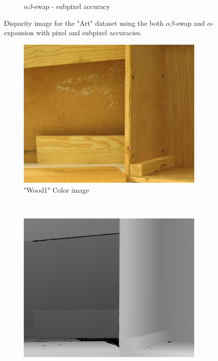 \documentclass[letterpaper, 10 pt, conference]{ieeeconf}  %
\begin{document}
\begin{figure}[t]
\begin{subfigure}[b]{0.3\textwidth}
                \caption{$\alpha\beta$-swap - subpixel accuracy}
                \label{fig:farm}
        \end{subfigure}
        \caption{Disparity image for the "Art" dataset using the both $\alpha\beta$-swap and $\alpha$-expansion with pixel and subpixel accuracies.}
        \label{art}
\end{figure}

\begin{figure}[t]
        \centering
        \begin{subfigure}[b]{0.3\textwidth}
                \centering
                \includegraphics[width=\textwidth]{imgs/l2.png}
                \caption{"Wood1" Color image}
                \label{fig:trees}
        \end{subfigure}%
                ~ %
        \begin{subfigure}[b]{0.3\textwidth}
                \centering
                \includegraphics[width=\textwidth]{imgs/disp2.png}

\end{subfigure}
\end{figure}
\end{document}
